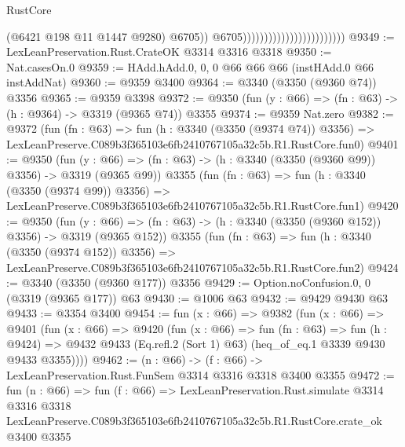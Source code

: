 \begin{lexlean}{RustCore}
\begin{coremodule}
                                                        (@6421 @198 @11 @1447 @9280)
                                                        @6705))
                                                    @6705))))))))))))))))))))))))
@9349 := LexLeanPreservation.Rust.CrateOK @3314 @3316 @3318
@9350 := Nat.casesOn.{0}
@9359 := HAdd.hAdd.{0, 0, 0} @66 @66 @66 (instHAdd.{0} @66 instAddNat)
@9360 := @9359 @3400
@9364 := @3340 (@3350 (@9360 @74)) @3356
@9365 := @9359 @3398
@9372 := @9350 (fun (y : @66) => (fn : @63) -> (h : @9364) -> @3319 (@9365 @74)) @3355
@9374 := @9359 Nat.zero
@9382 := @9372
    (fun (fn : @63) =>
    fun (h : @3340 (@3350 (@9374 @74)) @3356) =>
    LexLeanPreserve.C089b3f365103e6fb2410767105a32c5b.R1.RustCore.fun0)
@9401 := @9350
    (fun (y : @66) => (fn : @63) -> (h : @3340 (@3350 (@9360 @99)) @3356) -> @3319 (@9365 @99))
    @3355
    (fun (fn : @63) =>
    fun (h : @3340 (@3350 (@9374 @99)) @3356) =>
    LexLeanPreserve.C089b3f365103e6fb2410767105a32c5b.R1.RustCore.fun1)
@9420 := @9350
    (fun (y : @66) => (fn : @63) -> (h : @3340 (@3350 (@9360 @152)) @3356) -> @3319 (@9365 @152))
    @3355
    (fun (fn : @63) =>
    fun (h : @3340 (@3350 (@9374 @152)) @3356) =>
    LexLeanPreserve.C089b3f365103e6fb2410767105a32c5b.R1.RustCore.fun2)
@9424 := @3340 (@3350 (@9360 @177)) @3356
@9429 := Option.noConfusion.{0, 0} (@3319 (@9365 @177)) @63
@9430 := @1006 @63
@9432 := @9429 @9430 @63
@9433 := @3354 @3400
@9454 := fun (x : @66) =>
  @9382
    (fun (x : @66) =>
    @9401
      (fun (x : @66) =>
      @9420
        (fun (x : @66) =>
        fun (fn : @63) =>
        fun (h : @9424) =>
        @9432 @9433 (Eq.refl.{2} (Sort 1) @63) (heq_of_eq.{1} @3339 @9430 @9433 @3355))))
@9462 := (n : @66) -> (f : @66) -> LexLeanPreservation.Rust.FunSem @3314 @3316 @3318 @3400 @3355
@9472 := fun (n : @66) =>
  fun (f : @66) =>
  LexLeanPreservation.Rust.simulate
    @3314
    @3316
    @3318
    LexLeanPreserve.C089b3f365103e6fb2410767105a32c5b.R1.RustCore.crate_ok
    @3400
    @3355
\end{coremodule}
\end{lexlean}

